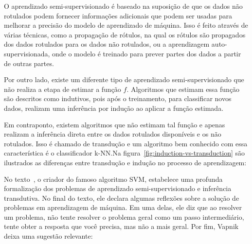 O aprendizado semi-supervisionado é baseado na suposição de que os
dados não rotulados podem fornecer informações adicionais que podem
ser usadas para melhorar a precisão do modelo de aprendizado de
máquina. Isso é feito através de várias técnicas, como a propagação de
rótulos, na qual os rótulos são propagados dos dados rotulados para os
dados não rotulados, ou a aprendizagem auto-supervisionada, onde o
modelo é treinado para prever partes dos dados a partir de outras
partes.

Por outro lado, existe um diferente tipo de aprendizado
semi-supervisionado que não realiza a etapa de estimar a função $ f
$. Algoritmos que estimam essa função são descritos como indutivos,
pois após o treinamento, para classificar novos dados, realizam uma
inferência por indução ao aplicar a função estimada.

Em contraponto, existem algoritmos que não estimam tal função e apenas
realizam a inferência direta entre os dados rotulados disponíveis e os
não rotulados. Isso é chamado de transdução e um algoritmo bem
conhecido com essa característica é o classificador \gls{k-NN}.\@ Na
figura~\ref{fig:induction-vs-transduction} são ilustrados as
diferenças entre transdução e indução no processo de aprendizagem:


\begin{figure}[h!]
        \captionsetup{width=12cm}
		\centering
\end{figure}


No texto~\cite{vapnik2006semi}, o criador do famoso algoritmo SVM,
estabelece uma profunda formalização dos problemas de aprendizado
semi-supervisionado e inferência transdutiva. No final do texto, ele declara
algumas reflexões sobre a solução de problemas em aprendizagem de
máquina. Em uma delas, ele diz que ao resolver um problema, não tente
resolver o problema geral como um passo intermediário, tente obter a
resposta que você precisa, mas não a mais geral. Por fim, Vapnik
deixa uma sugestão relevante:


